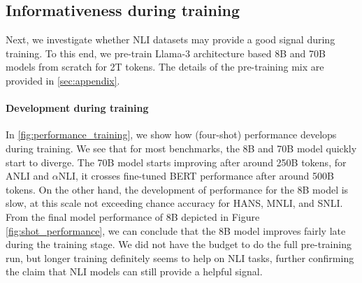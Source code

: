 \subsection{Informativeness during training}\label{subsec:during_training}

Next, we investigate whether NLI datasets may provide a good signal during training.
To this end, we pre-train Llama-3 architecture based 8B and 70B models from scratch for 2T tokens.
The details of the pre-training mix are provided in \cref{sec:appendix}. 

\paragraph{Development during training} In \cref{fig:performance_training}, we show how (four-shot) performance develops during training.
We see that for most benchmarks, the 8B and 70B model quickly start to diverge.
The 70B model starts improving after around 250B tokens, for ANLI and $\alpha$NLI, it crosses fine-tuned BERT performance after around 500B tokens.
On the other hand, the development of performance for the 8B model is slow, at this scale not exceeding chance accuracy for HANS, MNLI, and SNLI.
From the final model performance of 8B depicted in Figure \cref{fig:shot_performance}, we can conclude that the 8B model improves fairly late during the training stage.
We did not have the budget to do the full pre-training run, but longer training definitely seems to help on NLI tasks, further confirming the claim that NLI models can still provide a helpful signal.

